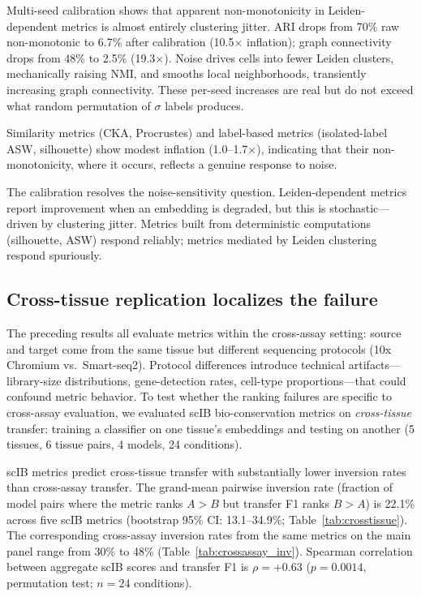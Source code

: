 \documentclass[11pt]{article}
\begin{document}
Multi-seed calibration shows that apparent non-monotonicity in
Leiden-dependent metrics is almost entirely clustering jitter. ARI
drops from 70\% raw non-monotonic to 6.7\% after calibration
(10.5$\times$ inflation); graph connectivity drops from 48\% to 2.5\%
(19.3$\times$). Noise drives cells into fewer Leiden clusters,
mechanically raising NMI, and smooths local neighborhoods, transiently
increasing graph connectivity. These per-seed increases are real but
do not exceed what random permutation of $\sigma$ labels produces.

Similarity metrics (CKA, Procrustes) and label-based metrics
(isolated-label ASW, silhouette) show modest inflation
(1.0--1.7$\times$), indicating that their non-monotonicity, where it
occurs, reflects a genuine response to noise.

The calibration resolves the noise-sensitivity question. Leiden-dependent
metrics report improvement when an embedding is degraded, but this is
stochastic---driven by clustering jitter. Metrics built from
deterministic computations (silhouette, ASW) respond reliably; metrics
mediated by Leiden clustering respond spuriously.


\subsection{Cross-tissue replication localizes the failure}
\label{sec:crosstissue}

The preceding results all evaluate metrics within the cross-assay
setting: source and target come from the same tissue but different
sequencing protocols (10x Chromium vs.\ Smart-seq2). Protocol
differences introduce technical artifacts---library-size distributions,
gene-detection rates, cell-type proportions---that could confound metric
behavior. To test whether the ranking failures are specific to
cross-assay evaluation, we evaluated scIB bio-conservation metrics on
\emph{cross-tissue} transfer: training a classifier on one tissue's
embeddings and testing on another (5 tissues, 6 tissue pairs, 4 models,
24 conditions).

scIB metrics predict cross-tissue transfer with substantially lower
inversion rates than cross-assay transfer. The grand-mean pairwise
inversion rate (fraction of model pairs where the metric ranks
$A > B$ but transfer F1 ranks $B > A$) is 22.1\% across five scIB
metrics (bootstrap 95\% CI: 13.1--34.9\%;
Table~\ref{tab:crosstissue}). The corresponding cross-assay inversion
rates from the same metrics on the main panel range from 30\% to 48\%
(Table~\ref{tab:crossassay_inv}). Spearman correlation between
aggregate scIB scores and transfer F1 is $\rho = +0.63$ ($p = 0.0014$,
permutation test; $n = 24$ conditions).
\end{document}
